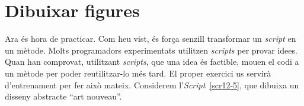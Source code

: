 \section{Dibuixar figures}
Ara és hora de practicar. Com heu vist, és força senzill transformar un \emph{script} en un mètode. Molts programadors experimentats utilitzen \emph{scripts} per provar idees. Quan han comprovat, utilitzant \emph{scripts}, que una idea és factible, mouen el codi a un mètode per poder reutilitzar-lo més tard. El proper exercici us servirà d'entrenament per fer això mateix. Considerem l'\emph{Script}~\ref{scr12-5}, que dibuixa un disseny abstracte ``art nouveau''.
\newpage
{}

